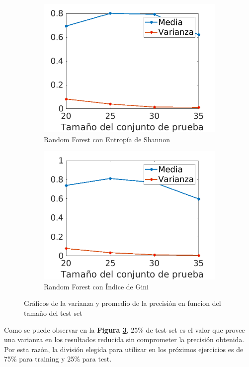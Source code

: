 \documentclass[a4paper]{article}
\newcommand{\reffig}[1]{\textbf{Figura \ref{#1}}}
\begin{document}
\begin{figure}[h]
\begin{subfigure}{.4\textwidth}
      \includegraphics[width=\linewidth]{img/test-set-rf-shannon.png}
      \caption{Random Forest con Entropía de Shannon}
      \label{test-size:sfig3}
    \end{subfigure}
    \begin{subfigure}{.4\textwidth}
      \centering
      \includegraphics[width=\linewidth]{img/test-set-rf-gini.png}
      \caption{Random Forest con Índice de Gini}
      \label{test-size:sfig4}
    \end{subfigure}
    \caption{Gráficos de la varianza y promedio de la precisión en funcion del tamaño del test set}
    \label{test-size:fig}
  \end{figure}

  Como se puede observar en la \reffig{test-size:fig}, 25\% de test set es el valor que provee una varianza en los resultados reducida sin comprometer la precisión obtenida. Por esta razón, la división elegida para utilizar en los próximos ejercicios es de 75\% para training y 25\% para test.
\end{document}
